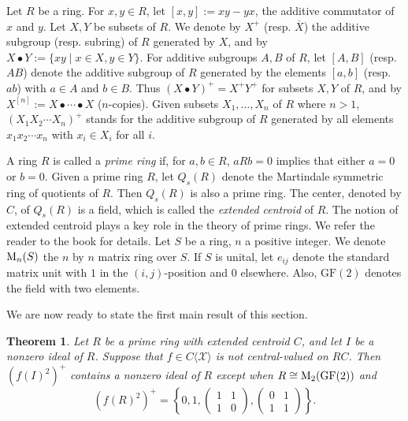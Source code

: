 \documentclass[11pt]{article}
\newtheorem{theorem}{Theorem}
\theoremstyle{definition}
\begin{document}
{{{{				Let $R$ be a ring.
				For $x, y\in R$, let $[x, y]:=xy-yx$, the additive commutator of $x$ and $y$.
				Let $X, Y$ be subsets of $R$. We denote by $X^+$ (resp. ${\overline X}$) the additive subgroup (resp. subring) of $R$ generated by $X$, and by
				$
				X\bullet Y:=\{xy\mid x\in X, y\in Y\}.
				$
				For additive subgroups $A, B$ of $R$, let $[A, B]$ (resp. $AB$) denote the additive subgroup of $R$ generated by the elements $[a, b]$ (resp. $ab$) with $a\in A$ and $b\in B$. Thus $(X\bullet Y)^+=X^+Y^+$ for subsets $X, Y$ of $R$, and by $X^{[n]}:=X\bullet\cdots\bullet X$ ($n$-copies).
				Given subsets $X_1,\ldots,X_n$ of $R$ where $n>1$, $(X_1X_2\cdots X_n)^+$ stands for the additive subgroup of $R$ generated by all elements $x_1x_2\cdots x_n$ with $x_i\in X_i$ for all $i$.
				
				A ring $R$ is called a \textit{prime ring} if, for $a, b\in R$, $aRb=0$ implies that either $a=0$ or $b=0$. Given a prime ring $R$, let $Q_s(R)$ denote the Martindale symmetric ring of quotients of $R$. Then $Q_s(R)$ is also a prime ring. The center, denoted by $C$, of $Q_s(R)$ is a field, which is called the \textit{extended centroid} of $R$. The notion of extended centroid plays a key role in the theory of prime rings. We refer the reader to the book \cite{Bei_96} for details. Let $S$ be a ring, $n$ a positive integer. We denote ${\rm M}_n(S)$ the $n$ by $n$ matrix ring over $S$. If $S$ is unital, let $e_{ij}$ denote the standard matrix unit with $1$ in the $(i,j)$-position and $0$ elsewhere. Also, $\mathrm{GF}(2)$ denotes the field with two elements.
				
				We are now ready to state the first main result of this section.
				
				\begin{theorem}\label{thm27}
					Let $R$ be a prime ring with extended centroid $C$, and let $I$ be a nonzero ideal of $R$. Suppose that $f\in C\langle \mathcal{X}\rangle$ is not central-valued on $RC$. Then $(f(I)^2)^+$ contains a nonzero ideal of $R$ except when $R\cong {\rm M}_2({\rm GF}(2))$ and
$$
(f(R)^2)^+=\left\{0, 1, \begin{pmatrix}
						1 & 1 \\
						1 & 0
					\end{pmatrix}, \begin{pmatrix}
						0 & 1 \\
						1 & 1
					\end{pmatrix}\right\}.
$$
				\end{theorem}
				
}}}}
\end{document}
